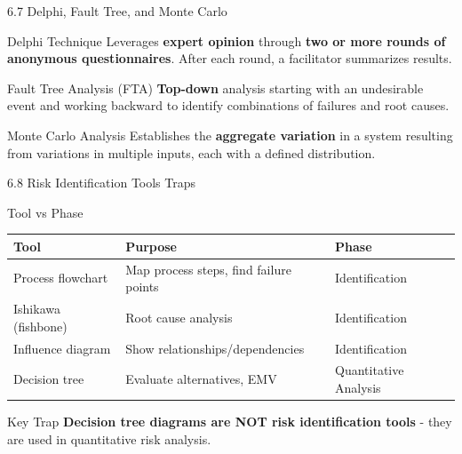 \documentclass{beamer}
\begin{document}
	\begin{frame}{6.7 Delphi, Fault Tree, and Monte Carlo}
		\begin{block}{Delphi Technique}
			Leverages \textbf{expert opinion} through \textbf{two or more rounds of anonymous questionnaires}. After each round, a facilitator summarizes results.
		\end{block}
		
		\begin{block}{Fault Tree Analysis (FTA)}
			\textbf{Top-down} analysis starting with an undesirable event and working backward to identify combinations of failures and root causes.
		\end{block}
		
		\begin{block}{Monte Carlo Analysis}
			Establishes the \textbf{aggregate variation} in a system resulting from variations in multiple inputs, each with a defined distribution.
		\end{block}
	\end{frame}
	
	\begin{frame}{6.8 Risk Identification Tools Traps}
		\begin{block}{Tool vs Phase}
			\begin{tabular}{|p{4cm}|p{4.5cm}|p{3cm}|}
				\hline
				\textbf{Tool} & \textbf{Purpose} & \textbf{Phase} \\
				\hline
				Process flowchart & Map process steps, find failure points & Identification \\
				\hline
				Ishikawa (fishbone) & Root cause analysis & Identification \\
				\hline
				Influence diagram & Show relationships/dependencies & Identification \\
				\hline
				Decision tree & Evaluate alternatives, EMV & Quantitative Analysis \\
				\hline
			\end{tabular}
		\end{block}
		
		\begin{alertblock}{Key Trap}
			\textbf{Decision tree diagrams are NOT risk identification tools} - they are used in quantitative risk analysis.
		\end{alertblock}
	\end{frame}
	
\end{document}
